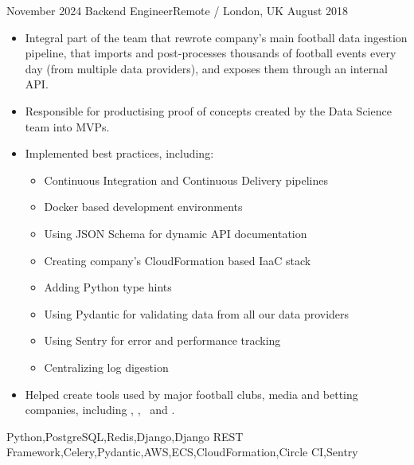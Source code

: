 \documentclass[localFont,alternative,10pt]{yaac-another-awesome-cv}
\begin{document}
  \begin{experiences}
    \experience
      {November 2024} {Backend Engineer}{}{Remote / London, UK}
      {August 2018}   {
                        \begin{itemize}
                          \item Integral part of the team that rewrote company's main football data ingestion pipeline, that imports and post-processes thousands of football events every day (from multiple data providers), and exposes them through an internal API.
                          \item Responsible for productising proof of concepts created by the Data Science team into MVPs.
                          \item Implemented best practices, including:
                            \begin{itemize}
                              \item Continuous Integration and Continuous Delivery pipelines
                              \item Docker based development environments
                              \item Using JSON Schema for dynamic API documentation
                              \item Creating company's CloudFormation based IaaC stack
                              \item Adding Python type hints
                              \item Using Pydantic for validating data from all our data providers
                              \item Using Sentry for error and performance tracking
                              \item Centralizing log digestion
                            \end{itemize}
                          \item Helped create tools used by major football clubs, media and betting companies, including , , ~and .
                        \end{itemize}
                      }
                      {Python,PostgreSQL,Redis,Django,Django REST Framework,Celery,Pydantic,AWS,ECS,CloudFormation,Circle CI,Sentry}
    \emptySeparator
    \experience

\end{experiences}
\end{document}
